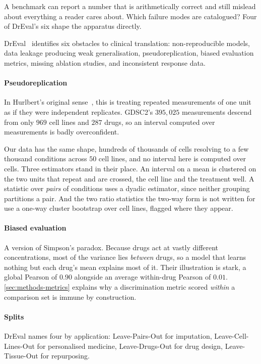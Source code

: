\begin{question}
A benchmark can report a number that is arithmetically correct and still mislead
about everything a reader cares about. Which failure modes are catalogued? Four
of DrEval's six shape the apparatus directly.
\end{question}

\noindent
DrEval~\cite{dreval} identifies six obstacles to clinical translation:
non-reproducible models, data leakage producing weak generalisation,
pseudoreplication, biased evaluation metrics, missing ablation studies, and
inconsistent response data.

\paragraph{Pseudoreplication} In Hurlbert's original sense~\cite{hurlbert}, this
is treating repeated measurements of one unit as if they were independent
replicates. GDSC2's $395{,}025$ measurements descend from only $969$ cell lines
and $287$ drugs, so an interval computed over measurements is badly
overconfident.

Our data has the same shape, hundreds of thousands of cells resolving to a few
thousand conditions across $50$ cell lines, and no interval here is computed over
cells. Three estimators stand in their place. An interval on a mean is clustered
on the two units that repeat and are crossed, the cell line and the treatment
well. A statistic over \emph{pairs} of conditions uses a dyadic estimator, since
neither grouping partitions a pair. And the two ratio statistics the two-way form
is not written for use a one-way cluster bootstrap over cell lines, flagged where
they appear.

\paragraph{Biased evaluation} A version of Simpson's paradox. Because drugs act
at vastly different concentrations, most of the variance lies \emph{between}
drugs, so a model that learns nothing but each drug's mean explains most of it.
Their illustration is stark, a global Pearson of $0.90$ alongside an average
within-drug Pearson of $0.01$. \cref{sec:methods-metrics} explains why a
discrimination metric scored \emph{within} a comparison set is immune by
construction.

\paragraph{Splits} DrEval names four by application: Leave-Pairs-Out for
imputation, Leave-Cell-Lines-Out for personalised medicine, Leave-Drugs-Out for
drug design, Leave-Tissue-Out for
repurposing.

